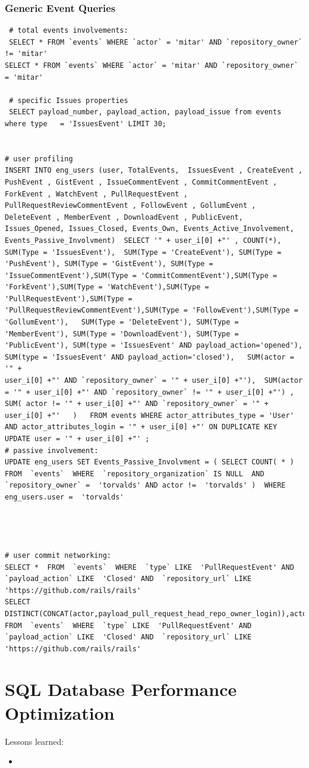 \documentclass[a4paper,10pt]{article}
\begin{document}
\subsubsection{Generic Event Queries}
\begin{lstlisting}
 # total events involvements:
 SELECT * FROM `events` WHERE `actor` = 'mitar' AND `repository_owner` != 'mitar'
SELECT * FROM `events` WHERE `actor` = 'mitar' AND `repository_owner` = 'mitar'

 # specific Issues properties
 SELECT payload_number, payload_action, payload_issue from events where type   = 'IssuesEvent' LIMIT 30;


# user profiling
INSERT INTO eng_users (user, TotalEvents,  IssuesEvent , CreateEvent , PushEvent , GistEvent , IssueCommentEvent , CommitCommentEvent , ForkEvent , WatchEvent , PullRequestEvent , PullRequestReviewCommentEvent , FollowEvent , GollumEvent , DeleteEvent , MemberEvent , DownloadEvent , PublicEvent, Issues_Opened, Issues_Closed, Events_Own, Events_Active_Involvement, Events_Passive_Involvment)  SELECT '" + user_i[0] +"' , COUNT(*),  SUM(Type = 'IssuesEvent'),  SUM(Type = 'CreateEvent'), SUM(Type = 'PushEvent'), SUM(Type = 'GistEvent'), SUM(Type = 'IssueCommentEvent'),SUM(Type = 'CommitCommentEvent'),SUM(Type = 'ForkEvent'),SUM(Type = 'WatchEvent'),SUM(Type = 'PullRequestEvent'),SUM(Type = 'PullRequestReviewCommentEvent'),SUM(Type = 'FollowEvent'),SUM(Type = 'GollumEvent'),   SUM(Type = 'DeleteEvent'), SUM(Type = 'MemberEvent'), SUM(Type = 'DownloadEvent'), SUM(Type = 'PublicEvent'), SUM(type = 'IssuesEvent' AND payload_action='opened'), SUM(type = 'IssuesEvent' AND payload_action='closed'),   SUM(actor = '" + 
user_i[0] +"' AND `repository_owner` = '" + user_i[0] +"'),  SUM(actor = '" + user_i[0] +"' AND `repository_owner` != '" + user_i[0] +"') , SUM( actor != '" + user_i[0] +"' AND `repository_owner` = '" + user_i[0] +"'   )   FROM events WHERE actor_attributes_type = 'User' AND actor_attributes_login = '" + user_i[0] +"' ON DUPLICATE KEY UPDATE user = '" + user_i[0] +"' ;
# passive involvement:
UPDATE eng_users SET Events_Passive_Involvment = ( SELECT COUNT( * )  FROM  `events`  WHERE  `repository_organization` IS NULL  AND   `repository_owner` =  'torvalds' AND actor !=  'torvalds' )  WHERE eng_users.user =  'torvalds'




# user commit networking:
SELECT *  FROM  `events`  WHERE  `type` LIKE  'PullRequestEvent' AND  `payload_action` LIKE  'Closed' AND  `repository_url` LIKE  'https://github.com/rails/rails'
SELECT DISTINCT(CONCAT(actor,payload_pull_request_head_repo_owner_login)),actor,payload_pull_request_head_repo_owner_login
FROM  `events`  WHERE  `type` LIKE  'PullRequestEvent' AND  `payload_action` LIKE  'Closed' AND  `repository_url` LIKE  'https://github.com/rails/rails'
\end{lstlisting}


\section{SQL Database Performance Optimization}
Lessons learned:
\begin{itemize}
 \item 
\end{itemize}
\end{document}
